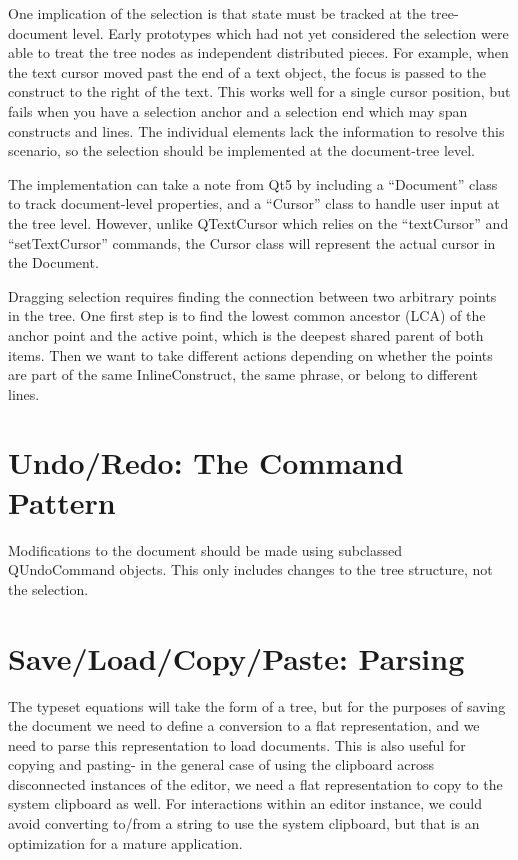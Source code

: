 \documentclass[12pt]{article}
\begin{document}
One implication of the selection is that state must be tracked at the tree-document level. Early prototypes which had not yet considered the selection were able to treat the tree nodes as independent distributed pieces. For example, when the text cursor moved past the end of a text object, the focus is passed to the construct to the right of the text. This works well for a single cursor position, but fails when you have a selection anchor and a selection end which may span constructs and lines. The individual elements lack the information to resolve this scenario, so the selection should be implemented at the document-tree level.

The implementation can take a note from Qt5 by including a ``Document'' class to track document-level properties, and a ``Cursor'' class to handle user input at the tree level. However, unlike QTextCursor which relies on the ``textCursor'' and ``setTextCursor'' commands, the Cursor class will represent the actual cursor in the Document.

Dragging selection requires finding the connection between two arbitrary points in the tree. One first step is to find the lowest common ancestor (LCA) of the anchor point and the active point, which is the deepest shared parent of both items. Then we want to take different actions depending on whether the points are part of the same InlineConstruct, the same phrase, or belong to different lines.

\section{Undo/Redo: The Command Pattern}

Modifications to the document should be made using subclassed QUndoCommand objects. This only includes changes to the tree structure, not the selection.

\section{Save/Load/Copy/Paste: Parsing}
The typeset equations will take the form of a tree, but for the purposes of saving the document we need to define a conversion to a flat representation, and we need to parse this representation to load documents. This is also useful for copying and pasting- in the general case of using the clipboard across disconnected instances of the editor, we need a flat representation to copy to the system clipboard as well. For interactions within an editor instance, we could avoid converting to/from a string to use the system clipboard, but that is an optimization for a mature application.
\end{document}
